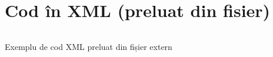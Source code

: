 \newpage
\section{Cod în XML (preluat din fisier)}
\label{anexa8:listing_xml}

\begin{code}
    \inputminted{xml}{anexe/coduri_sursa/pom.xml}
    \caption{Exemplu de cod XML preluat din fișier extern}
    \label{code:xml_pom}
\end{code}


